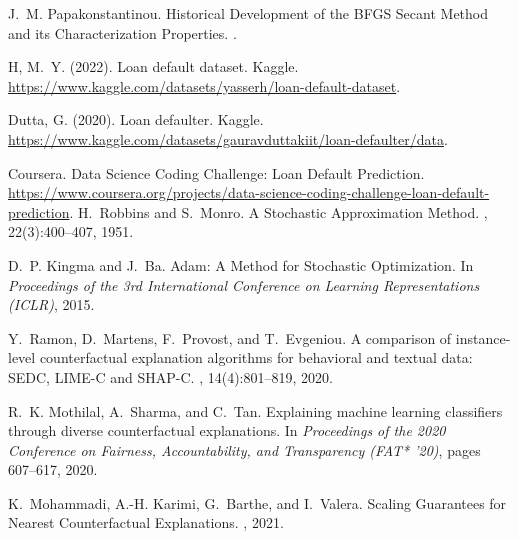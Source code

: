 \documentclass[12pt]{extarticle}
\numberwithin{equation}{section}
\begin{document}
\begin{thebibliography}{99}
J.~M. Papakonstantinou.
\newblock Historical Development of the BFGS Secant Method and its Characterization Properties.
.

\newblock H, M.~Y. (2022). Loan default dataset. Kaggle. 
\newblock \url{https://www.kaggle.com/datasets/yasserh/loan-default-dataset}.

\newblock Dutta, G. (2020). Loan defaulter. Kaggle. 
\newblock \url{https://www.kaggle.com/datasets/gauravduttakiit/loan-defaulter/data}.

\newblock Coursera. Data Science Coding Challenge: Loan Default Prediction. 
\newblock \url{https://www.coursera.org/projects/data-science-coding-challenge-loan-default-prediction}.
H.~Robbins and S.~Monro.
\newblock A Stochastic Approximation Method.
, 22(3):400--407, 1951.

D.~P. Kingma and J.~Ba.
\newblock Adam: A Method for Stochastic Optimization.
\newblock In {\em Proceedings of the 3rd International Conference on Learning Representations (ICLR)}, 2015.

Y.~Ramon, D.~Martens, F.~Provost, and T.~Evgeniou.
\newblock A comparison of instance-level counterfactual explanation algorithms for behavioral and textual data: SEDC, LIME-C and SHAP-C.
, 14(4):801--819, 2020.

R.~K. Mothilal, A.~Sharma, and C.~Tan.
\newblock Explaining machine learning classifiers through diverse counterfactual explanations.
\newblock In {\em Proceedings of the 2020 Conference on Fairness, Accountability, and Transparency (FAT* '20)}, pages 607--617, 2020.

K.~Mohammadi, A.-H. Karimi, G.~Barthe, and I.~Valera.
\newblock Scaling Guarantees for Nearest Counterfactual Explanations.
, 2021.
\end{thebibliography}
\end{document}
